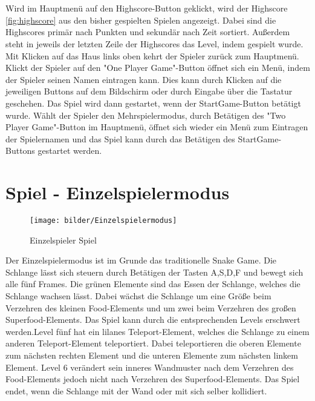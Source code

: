 \newline \\ \\
Wird im Hauptmenü auf den Highscore-Button geklickt, wird der Highscore \ref{fig:highscore} aus den bisher gespielten Spielen angezeigt. Dabei sind die Highscores primär nach Punkten und sekundär nach Zeit sortiert. Außerdem steht in jeweils der letzten Zeile der Highscores das Level, indem gespielt wurde. Mit Klicken auf das Haus links oben kehrt der Spieler zurück zum Hauptmenü.
\\
 Klickt der Spieler auf den "One Player Game"-Button öffnet sich ein Menü, indem der Spieler seinen Namen eintragen kann. Dies kann durch Klicken auf die jeweiligen Buttons auf dem Bildschirm oder durch Eingabe über die Tastatur geschehen. Das Spiel wird dann gestartet, wenn der StartGame-Button betätigt wurde. Wählt der Spieler den Mehrspielermodus, durch Betätigen des "Two Player Game"-Button im Hauptmenü, öffnet sich wieder ein Menü zum Eintragen der Spielernamen und das Spiel kann durch das Betätigen des StartGame-Buttons gestartet werden.  


\section{Spiel - Einzelspielermodus}
\label{Spiel_-_Unterkapitel_2}
%
\begin{figure}[h]
 \centering
 \texttt{[image: bilder/Einzelspielermodus]}
 \caption{Einzelspieler Spiel}
 \label{fig:einzelspielermodus}
\end{figure}
	Der Einzelspielermodus ist im Grunde das traditionelle Snake Game. Die Schlange lässt sich steuern durch Betätigen der Tasten A,S,D,F und bewegt sich alle fünf Frames. Die grünen Elemente sind das Essen der Schlange, welches die Schlange wachsen lässt. Dabei wächst die Schlange um eine Größe beim Verzehren des kleinen Food-Elements und um zwei beim Verzehren des großen Superfood-Elements.
	Das Spiel kann durch die entsprechenden Levels erschwert werden.Level fünf hat ein lilanes Teleport-Element, welches die Schlange zu einem anderen Teleport-Element teleportiert. Dabei teleportieren die oberen Elemente zum nächsten rechten Element und die unteren Elemente zum nächsten linkem Element. Level 6 verändert sein inneres Wandmuster nach dem Verzehren des Food-Elements jedoch nicht nach Verzehren des Superfood-Elements. Das Spiel endet, wenn die Schlange mit der Wand oder mit sich selber kollidiert.   


